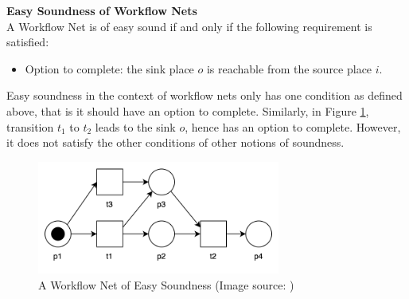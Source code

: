 \begin{defn}\textbf{Easy Soundness of Workflow Nets} \cite{Malinao2017}\\
    \label{EasyWNDef}
    A Workflow Net is of easy sound if and only if the following requirement is satisfied:
    \begin{itemize}
        \item Option to complete: the sink place $ o $ is reachable from the source place $ i $.
    \end{itemize}
\end{defn}
Easy soundness in the context of workflow nets only has one condition as defined above, that is it should have an option to complete. Similarly, in Figure \ref{WNEasy}, transition $t_1$ to $t_2$ leads to the sink $o$, hence has an option to complete. However, it does not satisfy the other conditions of other notions of soundness.

\begin{figure}[H]
    \centering
    \includegraphics[width=8cm]{../figures/EasySoundWFNet.png}
    \caption{A Workflow Net of Easy Soundness (Image source: \cite{Aalst2011})}
    \label{WNEasy}
\end{figure}

